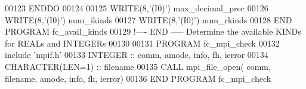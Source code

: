 \begin{DoxyCode}
00123 \textcolor{keywordflow}{      ENDDO}
00124 
00125      \textcolor{keyword}{WRITE}(8,\textcolor{stringliteral}{'(I0)'}) max\_decimal\_prec
00126      \textcolor{keyword}{WRITE}(8,\textcolor{stringliteral}{'(I0)'}) num\_ikinds
00127      \textcolor{keyword}{WRITE}(8,\textcolor{stringliteral}{'(I0)'}) num\_rkinds
00128 \textcolor{keyword}{END PROGRAM }fc\_avail\_kinds
00129 \textcolor{comment}{!---- END ----- Determine the available KINDs for REALs and INTEGERs}
00130 
00131 \textcolor{keyword}{PROGRAM} fc\_mpi\_check
00132   include \textcolor{stringliteral}{'mpif.h'}
00133   \textcolor{keywordtype}{INTEGER} :: comm, amode, info, fh, ierror
00134   \textcolor{keywordtype}{CHARACTER(LEN=1)} :: filename 
00135   \textcolor{keyword}{CALL }mpi\_file\_open( comm, filename, amode, info, fh, ierror)
00136 \textcolor{keyword}{END PROGRAM }fc\_mpi\_check
\end{DoxyCode}
